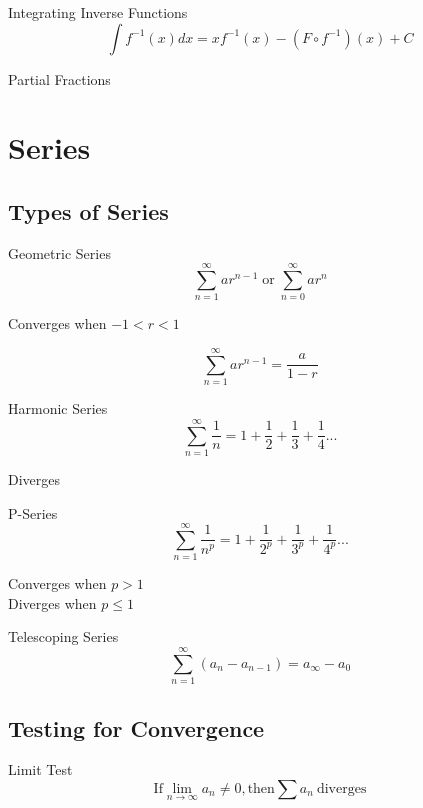 \documentclass[12pt]{article}
\numberwithin{equation}{subsection}
\begin{document}
\begin{flushleft}
\begin{center}
\begin{tabular}{cccc}
\end{tabular}
\end{center}

Integrating Inverse Functions
\begin{equation}
\int f^{-1}(x) dx = xf^{-1}(x)-(F\circ f^{-1})(x)+C
\end{equation}

Partial Fractions

\newpage

\section{Series}
\subsection{Types of Series}
Geometric Series
\begin{equation}
\sum_{n=1}^{\infty}ar^{n-1}\;  \textrm{or} \; \sum_{n=0}^{\infty}ar^{n}
\end{equation}

\begin{center}
Converges when $-1<r<1$
\end{center}
\begin{equation}
\sum_{n=1}^{\infty}ar^{n-1}= \frac{a}{1-r}
\end{equation}

Harmonic Series
\begin{equation}
\sum_{n=1}^{\infty}\frac{1}{n}=1+\frac{1}{2}+\frac{1}{3}+\frac{1}{4}. . .
\end{equation}
\begin{center}
Diverges
\end{center}

P-Series
\begin{equation}
\sum_{n=1}^{\infty}\frac{1}{n^{p}}=1+\frac{1}{2^{p}}+\frac{1}{3^{p}}+\frac{1}{4^{p}}. . .
\end{equation}
\begin{center}
Converges when $p>1$\\
Diverges when $p\leq1$
\end{center}

Telescoping Series
\begin{equation}
\sum_{n=1}^{\infty}(a_{n}-a_{n-1})=a_{\infty}-a_{0}
\end{equation}

\subsection{Testing for Convergence}
Limit Test
\begin{equation}
\textrm{If} \lim_{n\rightarrow \infty}a_{n}\neq0, \textrm{then}\sum a_{n}\ \textrm{diverges}
\end{equation}


\end{flushleft}
\end{document}
